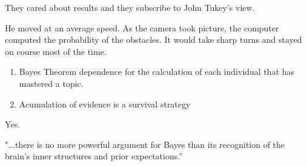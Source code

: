 \documentclass[12pt]{article}
\begin{document}

\begin{enumerate}

\begin{flushleft}
  They cared about results and they subscribe to John Tukey's view.
\end{flushleft}

\begin{flushleft}
    He moved at an average speed. As the camera took picture, the computer computed the probability of the obstacles. It would take sharp turns and 
    stayed on course most of the time.
\end{flushleft}

\begin{enumerate}
    \item Bayes Theorem dependence for the calculation of each individual that has mastered a topic. 
    \item Acumulation of evidence is a survival strategy
\end{enumerate}

\begin{flushleft}
    Yes.
\end{flushleft}

\begin{flushleft}
    "...there is no more powerful argument for Bayes than its recognition of the brain’s inner structures and prior expectations.”
\end{flushleft}

\end{enumerate}




\end{document}
